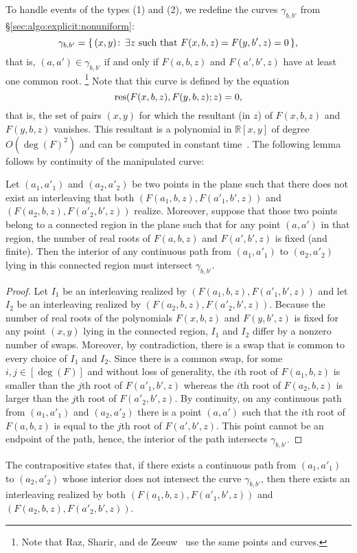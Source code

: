 To handle events of the types (1) and (2), we redefine the curves
$\gamma_{b,b'}$ from \S\ref{sec:algo:explicit:nonuniform}:
\begin{displaymath}
	\gamma_{b,b'} = \{\, (x,y) \st \exists z\ \text{such that}\
	F(x,b,z)=F(y,b',z)=0 \,\},
\end{displaymath}
that is, $(a,a') \in \gamma_{b,b'}$ if and only if $F(a,b,z)$ and $F(a',b',z)$
have at least one common root.%
\footnote{Note that Raz, Sharir, and de Zeeuw~\cite{RSZ15} use the same points
and curves.}
Note that this curve is defined
by the equation
\[\operatorname{res}(F(x,b,z),F(y,b,z);z) = 0,\]
that is, the set of pairs $(x,y)$ for which the resultant (in $z$) of
$F(x,b,z)$ and $F(y,b,z)$ vanishes. This resultant is a polynomial in
$\mathbb{R}[x,y]$ of degree $O(\deg(F)^2)$ and can be computed in constant time~\cite{CLO07}.
The following lemma follows by continuity of the manipulated curve:
\begin{lemma}\label{lem:cont}
    Let $(a_1,a'_1)$ and $(a_2,a'_2)$ be two points in the plane such
    that there does not exist an interleaving that both
    $(F(a_1,b,z),F(a'_1,b',z))$ and
    $(F(a_2,b,z),F(a'_2,b',z))$ realize. Moreover, suppose that those two
    points belong to a connected region in the plane such that for any point
    $(a,a')$ in that region, the number of real roots of $F(a,b,z)$ and
    $F(a',b',z)$ is fixed (and finite).
    Then the interior of any continuous path from $(a_1,a'_1)$ to $(a_2,a'_2)$ lying in this
    connected region must intersect $\gamma_{b,b'}$.
\end{lemma}
\begin{proof}
    Let $I_1$ be an interleaving realized by
    $(F(a_1,b,z),F(a'_1,b',z))$ and let $I_2$ be an interleaving realized
    by $(F(a_2,b,z),F(a'_2,b',z))$.
    Because the number of real roots of the polynomials $F(x,b,z)$ and
    $F(y,b',z)$ is fixed for any point $(x,y)$ lying in the connected region,
    $I_1$ and $I_2$ differ by a nonzero number of swaps.
    Moreover, by contradiction,
    there is a swap that is common to every choice of $I_1$
    and $I_2$.
    Since there is a common swap,
    for some $i,j \in [\deg(F)]$ and without loss of generality,
    the $i$th root of
    $F(a_1,b,z)$ is smaller than the $j$th root of $F(a'_1,b',z)$ whereas the
    $i$th root of $F(a_2,b,z)$ is larger than the $j$th root of
    $F(a'_2,b',z)$. By continuity, on any continuous path from
    $(a_1,a'_1)$ and $(a_2,a'_2)$ there is a point $(a,a')$ such that the
    $i$th root of $F(a,b,z)$ is equal to the $j$th root of $F(a',b',z)$.
    This point cannot be an endpoint of the path, hence,
    the interior of the path intersects $\gamma_{b,b'}$.
\end{proof}
The contrapositive states that, if there exists a continuous path from
$(a_1,a'_1)$ to $(a_2,a'_2)$ whose interior does not intersect the curve
$\gamma_{b,b'}$, then there exists an interleaving realized by both
$(F(a_1,b,z),F(a'_1,b',z))$ and $(F(a_2,b,z),F(a'_2,b',z))$.

